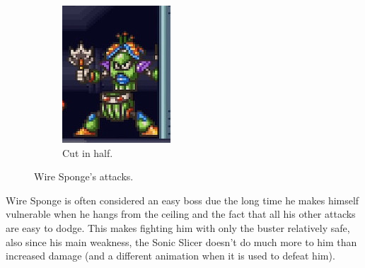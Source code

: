 \begin{figure}
\begin{subfigure}{0.28\linewidth}
		\centering
		\includegraphics[width=\linewidth]{figures/X2/Wire_sponge/sponge_cut.jpg}
		\caption{Cut in half.}
	\end{subfigure}
	
	\caption{Wire Sponge's attacks.}
\end{figure}

Wire Sponge is often considered an easy boss due the long time he makes himself vulnerable when he hangs from the ceiling and the fact that all his other attacks are easy to dodge. This makes fighting him with only the buster relatively safe, also since his main weakness, the Sonic Slicer doesn't do much more to him than increased damage (and a different animation when it is used to defeat him).

